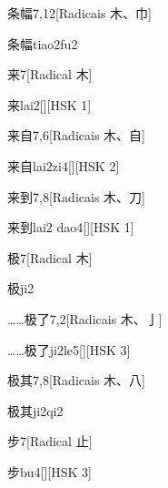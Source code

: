 \begin{entry}{条幅}{7,12}[Radicais ⽊、⼱]
  \begin{phonetics}{条幅}{tiao2fu2}
  \end{phonetics}
\end{entry}

\begin{entry}{来}{7}[Radical ⽊]
  \begin{phonetics}{来}{lai2}[][HSK 1]
  \end{phonetics}
\end{entry}

\begin{entry}{来自}{7,6}[Radicais ⽊、⾃]
  \begin{phonetics}{来自}{lai2zi4}[][HSK 2]
  \end{phonetics}
\end{entry}

\begin{entry}{来到}{7,8}[Radicais ⽊、⼑]
  \begin{phonetics}{来到}{lai2 dao4}[][HSK 1]
  \end{phonetics}
\end{entry}

\begin{entry}{极}{7}[Radical ⽊]
  \begin{phonetics}{极}{ji2}
  \end{phonetics}
\end{entry}

\begin{entry}{……极了}{7,2}[Radicais ⽊、⼅]
  \begin{phonetics}{……极了}{ji2le5}[][HSK 3]
  \end{phonetics}
\end{entry}

\begin{entry}{极其}{7,8}[Radicais ⽊、⼋]
  \begin{phonetics}{极其}{ji2qi2}
  \end{phonetics}
\end{entry}

\begin{entry}{步}{7}[Radical ⽌]
  \begin{phonetics}{步}{bu4}[][HSK 3]
  \end{phonetics}
\end{entry}


